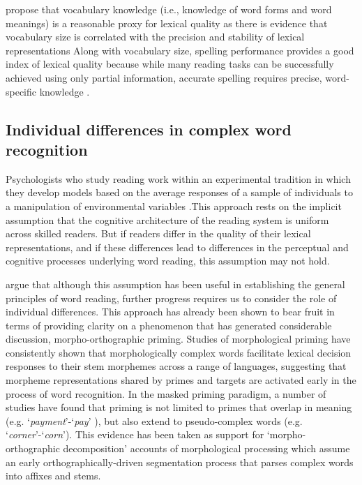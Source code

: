\documentclass[review]{elsarticle}
\begin{document}
\citet{yapIndividualDifferencesJoint2009} propose that vocabulary knowledge (i.e., knowledge of word forms and word meanings) is a reasonable proxy for lexical quality as there is evidence that vocabulary size is correlated with the precision and stability of lexical representations \citep{perfettiReadingAbilityLexical2007, perfettiLexicalQualityHypothesis2002, kiddIndividualDifferencesStatistical2016,kinoshitaAdditiveInteractiveEffects2006, kinoshitaHowLexicalDecision2006}  Along with vocabulary size, spelling performance provides a good index of lexical quality because while many reading tasks can be successfully achieved using only partial information, accurate spelling requires precise, word-specific knowledge \citep{perfettiRepresentationProblemReading1992}.

\subsection{Individual differences in complex word recognition}

Psychologists who study reading work within an experimental tradition in which they develop models based on the average responses of a sample of individuals to a manipulation of environmental variables \citep{cronbachTwoDisciplinesScientific1957}.This approach rests on the implicit assumption that the cognitive architecture of the reading system is uniform across skilled readers. But if readers differ in the quality of their lexical representations, and if these differences lead to differences in the perceptual and cognitive processes underlying word reading, this assumption may not hold.

{\renewcommand\&{and}\citet{andrewsMorphologicalPrimingStronger2013}} argue that although this assumption has been useful  in  establishing the general principles of word reading, further progress requires us to consider the role of individual differences.  This approach has already been shown to bear fruit in terms of providing clarity on a  phenomenon that has generated  considerable discussion, morpho-orthographic priming.  Studies of morphological priming have consistently shown that morphologically complex words facilitate lexical decision responses to their stem morphemes across a range of languages, suggesting that morpheme representations shared by primes and targets are activated early in the process of word recognition.  In the masked priming paradigm, a number of studies have found that priming is not limited to primes that overlap in meaning (e.g. `\textit{payment}'-`\textit{pay}' ), but also extend to pseudo-complex words (e.g. `\textit{corner}'-`\textit{corn}').  This evidence has been taken as support for `morpho-orthographic decomposition’ accounts of morphological processing \citep{rastleBrothMyBrother2004, rastleMorphologicalDecompositionBased2008} which assume an early orthographically-driven segmentation process that parses complex words into affixes and stems.
\end{document}
